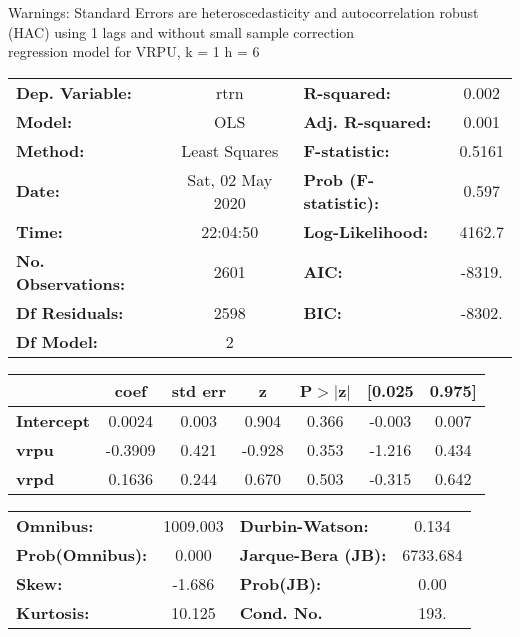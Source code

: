 Warnings: \newline
 [1] Standard Errors are heteroscedasticity and autocorrelation robust (HAC) using 1 lags and without small sample correction\\ 

regression model for VRPU, k = 1 h = 6\begin{center}
\begin{tabular}{lclc}
\toprule
\textbf{Dep. Variable:}    &       rtrn       & \textbf{  R-squared:         } &     0.002   \\
\textbf{Model:}            &       OLS        & \textbf{  Adj. R-squared:    } &     0.001   \\
\textbf{Method:}           &  Least Squares   & \textbf{  F-statistic:       } &    0.5161   \\
\textbf{Date:}             & Sat, 02 May 2020 & \textbf{  Prob (F-statistic):} &    0.597    \\
\textbf{Time:}             &     22:04:50     & \textbf{  Log-Likelihood:    } &    4162.7   \\
\textbf{No. Observations:} &        2601      & \textbf{  AIC:               } &    -8319.   \\
\textbf{Df Residuals:}     &        2598      & \textbf{  BIC:               } &    -8302.   \\
\textbf{Df Model:}         &           2      & \textbf{                     } &             \\
\bottomrule
\end{tabular}
\begin{tabular}{lcccccc}
                   & \textbf{coef} & \textbf{std err} & \textbf{z} & \textbf{P$> |$z$|$} & \textbf{[0.025} & \textbf{0.975]}  \\
\midrule
\textbf{Intercept} &       0.0024  &        0.003     &     0.904  &         0.366        &       -0.003    &        0.007     \\
\textbf{vrpu}      &      -0.3909  &        0.421     &    -0.928  &         0.353        &       -1.216    &        0.434     \\
\textbf{vrpd}      &       0.1636  &        0.244     &     0.670  &         0.503        &       -0.315    &        0.642     \\
\bottomrule
\end{tabular}
\begin{tabular}{lclc}
\textbf{Omnibus:}       & 1009.003 & \textbf{  Durbin-Watson:     } &    0.134  \\
\textbf{Prob(Omnibus):} &   0.000  & \textbf{  Jarque-Bera (JB):  } & 6733.684  \\
\textbf{Skew:}          &  -1.686  & \textbf{  Prob(JB):          } &     0.00  \\
\textbf{Kurtosis:}      &  10.125  & \textbf{  Cond. No.          } &     193.  \\
\bottomrule
\end{tabular}
\end{center}

